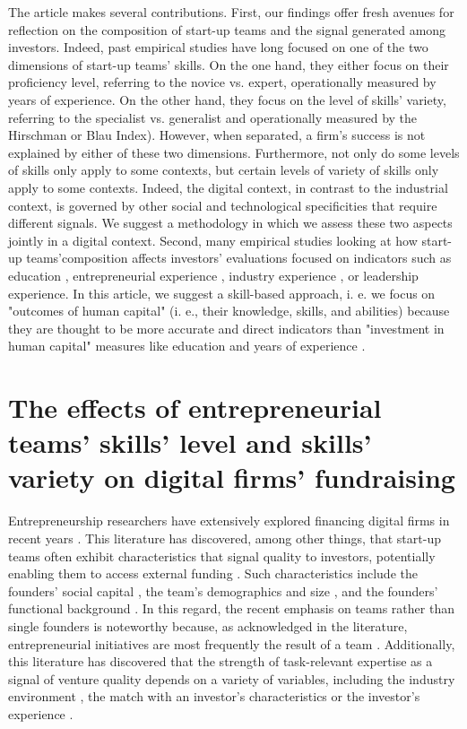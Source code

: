\documentclass[12pt]{article}
\begin{document}
The article makes several contributions. First, our findings offer fresh avenues for reflection on the composition of start-up teams and the signal generated among investors. Indeed, past empirical studies have long focused on one of the two dimensions of start-up teams' skills. On the one hand, they either focus on their proficiency level, referring to the novice vs. expert, operationally measured by years of experience. On the other hand, they focus on the level of skills' variety, referring to the specialist vs. generalist and operationally measured by the Hirschman or Blau Index). However, when separated, a firm's success is not explained by either of these two dimensions. Furthermore, not only do some levels of skills only apply to some contexts, but certain levels of variety of skills only apply to some contexts. Indeed, the digital context, in contrast to the industrial context, is governed by other social and technological specificities that require different signals. We suggest a methodology in which we assess these two aspects jointly in a digital context. Second, many empirical studies looking at how start-up teams'composition affects investors' evaluations focused on indicators such as education \citep{franke2008venture}, entrepreneurial experience \citep{beckman2007early}, industry experience \citep{becker2015new}, or leadership experience\citep{hoenig2015quality}. In this article, we suggest a skill-based approach, i. e. we focus on "outcomes of human capital" (i. e., their knowledge, skills, and abilities) because they are thought to be more accurate and direct indicators than "investment in human capital" measures like education and years of experience \citep{unger2011human, marvel2016human}.

\section{The effects of entrepreneurial teams' skills' level and skills' variety on digital firms' fundraising}

Entrepreneurship researchers have extensively explored financing digital firms in recent years \citep{klein2020start}. This literature has discovered, among other things, that start-up teams often exhibit characteristics that signal quality to investors, potentially enabling them to access external funding \citep{roure1990predictors, reese2020should}. Such characteristics include the founders' social capital \citep{shane2002network}, the team's demographics and size \citep{eisenhardt1990organizational}, and the founders' functional background \citep{ensley1998effect}. In this regard, the recent emphasis on teams rather than single founders is noteworthy because, as acknowledged in the literature, entrepreneurial initiatives are most frequently the result of a team \citep{klotz2014new}. Additionally, this literature has discovered that the strength of task-relevant expertise as a signal of venture quality depends on a variety of variables, including the industry environment \citep{townsend2015turning}, the match with an investor's characteristics \citep{aggarwal2015evaluating} or the investor's experience \citep{franke2008venture}.
\end{document}
